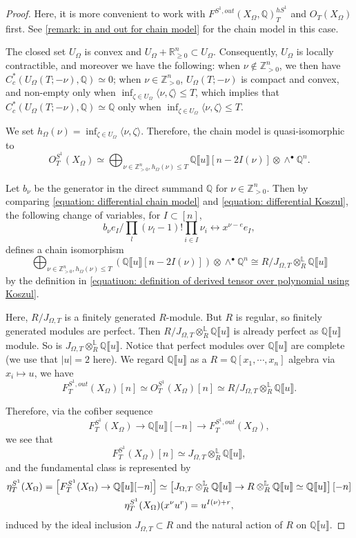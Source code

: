 \documentclass[11pt]{amsart}
\numberwithin{equation}{section}
\theoremstyle{plain}
\theoremstyle{definition}
\theoremstyle{remark}
\newcommand{\bQ} { {\mathbb{Q}}}
\newcommand{\bZ} { {\mathbb{Z}}}
\newcommand{\bR} { {\mathbb{R}}}
\newcommand{\fpw}[1]{{\llbracket #1\rrbracket}}
\begin{document}
\begin{proof}Here, it is more convenient to work with $F^{S^1,out}(X_\Omega,\bQ)_T^{hS^1}$ and $O_{T}(X_\Omega)$ first. See \autoref{remark: in and out for chain model} for the chain model in this case.

The closed set $U_\Omega$ is convex and $U_\Omega+\bR^n_{\geq 0} \subset U_\Omega$. Consequently, $U_\Omega$ is locally contractible, and moreover we have the following: when $\nu\notin \bZ^n_{>0}$, we then have $C^*_c(U_\Omega(T;-\nu),\bQ)\simeq 0$; when $\nu\in \bZ^n_{>0}$, $U_\Omega(T;-\nu)$ is compact and convex, and non-empty only when $\inf_{\zeta\in {U_{\Omega}}}\langle \nu,\zeta\rangle \leq T$, which implies that $C^*_c(U_\Omega(T;-\nu),\bQ)\simeq \bQ$ only when $\inf_{\zeta\in {U_{\Omega}}} \langle \nu,\zeta\rangle\leq T$. 

We set $h_\Omega(\nu)=\inf_{\zeta\in {U_{\Omega}}} \langle \nu,\zeta\rangle$. Therefore, the chain model is quasi-isomorphic to 
\[ O_T^{S^1}(X_\Omega)\simeq\bigoplus_{\nu\in \bZ^n_{>0},h_\Omega(\nu)\leq T}  \bQ\fpw{u}[n-2I(\nu)] \otimes \wedge^\bullet \bQ ^n.\] 


Let $b_\nu$ be the generator in the direct summand $\bQ$ for $\nu \in \bZ^n_{>0}$. 
Then by comparing \autoref{equation: differential chain model} and \autoref{equation: differential Koszul}, the following change of variables, for $I\subset [n]$,
\[b_\nu e_I/\prod_{l}(\nu_l-1)!\prod_{i\in I} \nu_i \leftrightarrow x^{\nu-e}e_I,\]
defines a chain isomorphism
\[ \bigoplus_{\nu\in \bZ^n_{>0},h_\Omega(\nu)\leq T}\left( \bQ\fpw{u}[n-2I(\nu)] \right)\otimes \wedge^\bullet \bQ ^n\cong R/J_{\Omega,T}\otimes_R^{\mathbb{L}} \bQ\fpw{u}\]
by the definition in \autoref{equatiuon: definition of derived tensor over polynomial using Koszul}.

Here, $R/J_{\Omega,T}$ is a finitely generated $R$-module. But $R$ is regular, so finitely generated modules are perfect. Then $R/J_{\Omega,T}\otimes_R^{\mathbb{L}} \bQ\fpw{u}$ is already perfect as $\bQ\fpw{u}$ module. So is $J_{\Omega,T}\otimes_R^{\mathbb{L}} \bQ\fpw{u}$. 
Notice that perfect modules over $\bQ\fpw{u}$ are complete (we use that $|u|=2$ here). We regard $\bQ\fpw{u}$ as a $R=\bQ[x_1,\cdots, x_n]$ algebra via $x_i\mapsto u$, we have 
\[F_T^{S^1,out}(X_\Omega)[n] \simeq O_T^{S^1}(X_\Omega) [n]\simeq R/J_{\Omega,T}\otimes_R^{\mathbb{L}} \bQ\fpw{u} .\]


Therefore, via the cofiber sequence
\[F_T^{S^1}(X_\Omega)\to \bQ\fpw{u}[-n] \to F_T^{S^1,out}(X_\Omega),\]
we see that
\[F_T^{S^1}(X_\Omega)[n] \simeq J_{\Omega,T}\otimes_R^{\mathbb{L}} \bQ\fpw{u},\]
and the fundamental class is represented by
\begin{gather} \label{equation: eta_T concave}
   \eta_T^{S^1}(X_\Omega)=\left[F_T^{S^1}(X_\Omega)\to \bQ\fpw{u}[-n]\right]\simeq \left[J_{\Omega,T}\otimes_R^{\mathbb{L}} \bQ\fpw{u} \to R\otimes_R^{\mathbb{L}} \bQ\fpw{u}\simeq \bQ\fpw{u}\right][-n]\\
   \eta_T^{S^1}(X_\Omega)(x^\nu u^r)=u^{I(\nu)+r}, \notag
\end{gather}
induced by the ideal inclusion $J_{\Omega,T}\subset R$ and the natural action of $R$ on $\bQ\fpw{u}$.
\end{proof}
\end{document}
